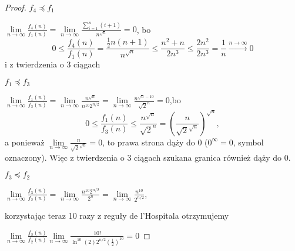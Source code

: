\documentclass[50pt]{mwart}
\begin{document}
\begin{proof}
	$ f_4\preccurlyeq f_1 $

\noindent$ \lim\limits_{n\to\infty} \frac{f_4(n)}{f_1(n)} = \lim\limits_{n\to\infty} \frac{\sum^n_{i=1}(i+1)}{n^{\sqrt n}} = 0 $, bo
$$ 0 \le \frac{f_4(n)}{f_1(n)} = \frac{\frac{1}{2}n(n+1)}{n^{\sqrt n}} \le \frac{n^2 + n}{2n^3} \le \frac{2n^2}{2n^3}  = \frac{1}{n} \overset{n\to\infty}{\to} 0 $$
i z twierdzenia o 3 ciągach\newline

$ f_1 \preccurlyeq f_3 $

\noindent$ \lim\limits_{n\to\infty} \frac{f_1(n)}{f_3(n)} = \lim\limits_{n\to\infty} \frac{n^{\sqrt n}}{n^{10}2^{n/2}} = \lim\limits_{n\to\infty} \frac{n^{\sqrt n - 10}}{{\sqrt 2}^n} = 0$,bo 
$$0\le \frac{f_1(n)}{f_3(n)} \le \frac{n^{\sqrt n}}{{\sqrt 2}^n} = {\left(\frac{n}{{\sqrt 2}^{\sqrt n}}\right)}^{\sqrt n},$$
a ponieważ
$\lim\limits_{n\to\infty} \frac{n}{{\sqrt 2}^{\sqrt n}} = 0$, to prawa strona dąży do 0 ($0^\infty=0$, symbol oznaczony). Więc z twierdzenia o 3 ciągach szukana granica również dąży do 0.\newline


$ f_3 \preccurlyeq f_2 $

\noindent $ \lim\limits_{n\to\infty} \frac{f_3(n)}{f_2(n)} = \lim\limits_{n\to\infty} \frac{n^{10}2^{n/2}}{2^n} = \lim\limits_{n\to\infty} \frac{n^{10}}{2^{n/2}}$,\newline

\noindent korzystając teraz 10 razy z reguły de l'Hospitala otrzymujemy\newline

\noindent $\lim\limits_{n\to\infty} \frac{f_3(n)}{f_2(n)} \lim\limits_{n\to\infty} \frac{10!}{\ln^{10}(2)2^{n/2}\left(\frac{1}{2}\right)^{10}}=0$


\end{proof}
\end{document}
